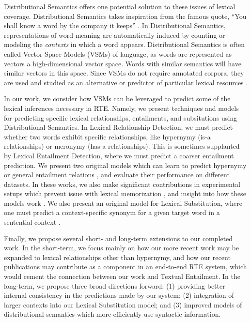 \documentclass[12pt]{article}
\begin{document}
Distributional Semantics offers one potential solution to these issues of lexical
coverage. Distributional Semantics takes inspiration from the famous quote,
``You shall know a word by the company it keeps'' \cite{firth:1957:la}. In
Distributional Semantics, representations of word meaning are automatically
induced by counting or modeling the {\em contexts} in which a word appears.
Distributional Semantics is often called Vector Space Models (VSMs) of
language, as words are represented as vectors a high-dimensional vector space.
Words with similar semantics will have similar vectors in this
space. Since VSMs do not require annotated corpora, they are used and
studied as an alternative or predictor of particular lexical resources
\cite{baroni:2012:eacl,erk:2008:emnlp,turney:2010:jair}.

In our work, we consider how VSMs
can be leveraged to predict some of the lexical inferences necessary in RTE.
Namely, we present techniques and models for predicting specific
lexical relationships, entailments, and subsitutions using Distributional
Semantics. In Lexical Relationship Detection, we must
predict whether two words exhibit specific relationships, like hypernymy (is-a
relationships) or meronymy (has-a relationships). This is sometimes supplanted
by Lexical Entailment Detection, where we must predict a coarser entailment
prediction. We present two original models which can learn to predict hypernymy
or general entailment relations
\cite{roller:2014:coling,beltagy:2016:cl,roller:2016:emnlp}, and evaluate their
performance on different datasets. In these works, we also make significant
contributions in experimental setups which prevent issue with lexical
memorization \cite{roller:2014:coling}, and insight into how these models
work \cite{roller:2016:emnlp}.  We also present an original model for Lexical
Substitution, where one must predict a context-specific synonym for a given
target word in a sentential context \cite{roller:2016:naacl}.

Finally, we propose several short- and long-term extensions to our completed
work. In the short-term, we focus mainly on how our more recent work may be
expanded to lexical relationships other than hypernymy, and how our recent
publications may  contribute as a component in an end-to-end RTE system, which
would cement the connection between our work and Textual Entailment. In the
long-term, we propose three broad directions forward: (1) providing better
internal consistency in the predictions made by our system; (2) integration
of larger contexts into our Lexical Substitution model; and (3) improved
models of distributional semantics which more efficiently use syntactic
information.
\end{document}
